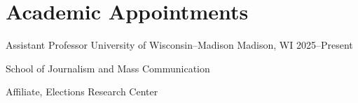 \section{Academic Appointments}

\cventry
  {Assistant Professor}
  {University of Wisconsin--Madison}
  {Madison, WI}
  {2025--Present}
  {\item School of Journalism and Mass Communication
   \item Affiliate, Elections Research Center}
